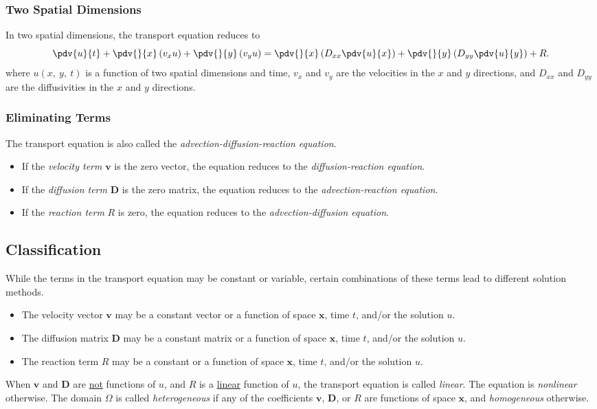 \documentclass{article}
\begin{document}
\subsubsection{Two Spatial Dimensions}
In two spatial dimensions, the transport equation reduces to
\begin{equation*}
    \pdv{u}{t} + \pdv{}{x} \left( v_x u \right) + \pdv{}{y} \left( v_y u \right) = \pdv{}{x} \left( D_{xx} \pdv{u}{x} \right) + \pdv{}{y} \left( D_{yy} \pdv{u}{y} \right) + R.
\end{equation*}
where \(u\left( x,\: y,\: t \right)\) is a function of two spatial
dimensions and time, \(v_x\) and \(v_y\) are the velocities in the \(x\)
and \(y\) directions, and \(D_{xx}\) and \(D_{yy}\) are the diffusivities
in the \(x\) and \(y\) directions.
\subsubsection{Eliminating Terms}
The transport equation is also called the
\textit{advection-diffusion-reaction equation}.
\begin{itemize}
    \item If the \textit{velocity term} \(\symbf{v}\) is the zero
          vector, the equation reduces to the
          \textit{diffusion-reaction equation}.
    \item If the \textit{diffusion term} \(\symbf{D}\) is the zero
          matrix, the equation reduces to the
          \textit{advection-reaction equation}.
    \item If the \textit{reaction term} \(R\) is zero, the equation
          reduces to the \textit{advection-diffusion equation}.
\end{itemize}
\subsection{Classification}
While the terms in the transport equation may be constant or variable,
certain combinations of these terms lead to different solution methods.
\begin{itemize}
    \item The velocity vector \(\symbf{v}\) may be a constant vector or
          a function of space \(\symbf{x}\), time \(t\), and/or the
          solution \(u\).
    \item The diffusion matrix \(\symbf{D}\) may be a constant matrix
          or a function of space \(\symbf{x}\), time \(t\), and/or the
          solution \(u\).
    \item The reaction term \(R\) may be a constant or a function of
          space \(\symbf{x}\), time \(t\), and/or the solution \(u\).
\end{itemize}
When \(\symbf{v}\) and \(\symbf{D}\) are \underline{not} functions of \(u\), and
\(R\) is a \underline{linear} function of \(u\), the transport equation is
called \textit{linear}. The equation is \textit{nonlinear} otherwise.
The domain \(\Omega\) is called \textit{heterogeneous} if any of the
coefficients \(\symbf{v}\), \(\symbf{D}\), or \(R\) are functions of
space \(\symbf{x}\), and \textit{homogeneous} otherwise.
\end{document}
